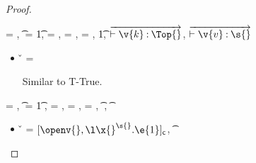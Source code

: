 \begin{lemma}
\begin{proof}
\begin{case}[T-Clos]
\begin{itemize}
\begin{subcase}[B-Abs]
      \end{subcase} 
  \end{itemize}
\end{case}

\begin{case}[T-Multi] \e{} = { {}},
  \t{} = {\MultiFntype {\s{}} {\t{1}}},
  {\thenprop {\prop{}}} = {\topprop{}},
  {\elseprop{\prop{}}} = {\botprop{}},
  {\object{}} = {\emptyobject{}},
  \judgementtwo {} { {\t{1}}},
  $\overrightarrow{\judgementtwo{}{\hastype{\v{k}}{\Top{}}}}$,
  $\overrightarrow{\judgementtwo{}{\hastype{\v{v}}{\s{}}}}$

  \begin{itemize}
    \item[]
      \begin{subcase}[B-Val] \v{} = { {}}

        Similar to T-True.
      \end{subcase}
  \end{itemize}

\end{case}

\begin{case}[T-Abs] \e{} = {\abs {\x{}} {\s{}} {}},
  \t{} = {\ArrowOne {\x{}} {\s{}}
                                                      {\t{1}}
                                                      {
                                                                  {}}
                                                      {}},
  {\thenprop{\prop{}}}= {\topprop{}},
  {\elseprop{\prop{}}}= {\botprop{}},
  {\object{}}= {\emptyobject{}},
{ \judgement {\propenv{}, {\isprop {\s{}} {\x{}}}}
            { {\t{}}}
             {
                         {}}
             {}},
\judgement {\propenv{}} { {\t{}}}
                 {\filterset {\thenprop {\prop{}}}
                             {\elseprop {\prop{}}}}
                 {\object{}}

  \begin{itemize}
    \item[]
      \begin{subcase}[B-Abs]
        \v{} = ${\closure {\openv{}} {\abs {\x{}} {\s{}} {\e{1}}}}$,
          { \opsem {\openv{}}
                   {\abs {\x{}} {\t{}} {}}
                   {\closure {\openv{}} {\abs {\x{}} {\s{}} {}}}}


\end{subcase}
\end{itemize}
\end{case}
\end{proof}
\end{lemma}

